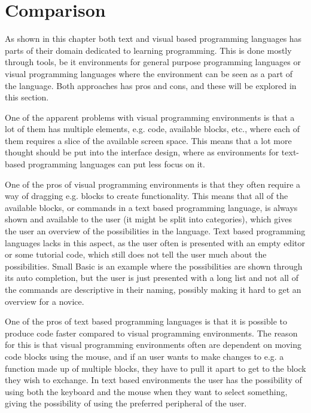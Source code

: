 \section{Comparison}
\label{sec:comparison_text_visual}
As shown in this chapter both text and visual based programming languages has parts of their domain dedicated to learning programming. This is done mostly through tools, be it environments for general purpose programming languages or visual programming languages where the environment can be seen as a part of the language. Both approaches has pros and cons, and these will be explored in this section.

\begin{description}[style=nextline]
\item[Interface Layout] One of the apparent problems with visual programming environments is that a lot of them has multiple elements, e.g. code, available blocks, etc., where each of them requires a slice of the available screen space. This means that a lot more thought should be put into the interface design, where as environments for text-based programming languages can put less focus on it.
\item[Statement Categories] One of the pros of visual programming environments is that they often require a way of dragging e.g. blocks to create functionality. This means that all of the available blocks, or commands in a text based programming language, is always shown and available to the user (it might be split into categories), which gives the user an overview of the possibilities in the language. Text based programming languages lacks in this aspect, as the user often is presented with an empty editor or some tutorial code, which still does not tell the user much about the possibilities. Small Basic is an example where the possibilities are shown through its auto completion, but the user is just presented with a long list and not all of the commands are descriptive in their naming, possibly making it hard to get an overview for a novice.
\item[Writing Speed] One of the pros of text based programming languages is that it is possible to produce code faster compared to visual programming environments. The reason for this is that visual programming environments often are dependent on moving code blocks using the mouse, and if an user wants to make changes to e.g. a function made up of multiple blocks, they have to pull it apart to get to the block they wish to exchange. In text based environments the user has the possibility of using both the keyboard and the mouse when they want to select something, giving the possibility of using the preferred peripheral of the user.
\end{description}
